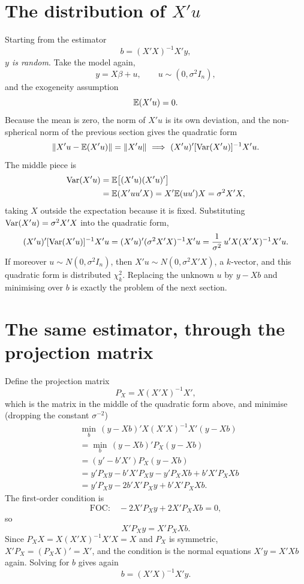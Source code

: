 \documentclass[11pt]{article}
\begin{document}
\section{The distribution of $X'u$}

Starting from the estimator
\[ b=(X'X)^{-1}X'y, \]
\emph{$y$ is random}. Take the model again,
\[ y=X\beta+u,\qquad u\sim(0,\sigma^2I_n), \]
and the exogeneity assumption
\[ \mathbb{E}(X'u)=0 . \]
Because the mean is zero, the norm of $X'u$ is its own deviation, and the
non-spherical norm of the previous section gives the quadratic form
\[ \|X'u-\E(X'u)\|=\|X'u\|\ \Longrightarrow\ (X'u)'[\Var(X'u)]^{-1}X'u . \]
The middle piece is
\[
\begin{aligned}
  \operatorname{Var}(X'u)&=\mathbb{E}\bigl[(X'u)(X'u)'\bigr]\\
           &=\mathbb{E}(X'uu'X)=X'\mathbb{E}(uu')X=\sigma^2X'X ,
\end{aligned}
\]
taking $X$ outside the expectation because it is fixed.
Substituting $\operatorname{Var}(X'u)=\sigma^2X'X$ into the quadratic form,
\[ (X'u)'[\operatorname{Var}(X'u)]^{-1}X'u
   =(X'u)'(\sigma^2X'X)^{-1}X'u
   =\frac{1}{\sigma^2}\,u'X(X'X)^{-1}X'u . \]
If moreover $u\sim N(0,\sigma^2I_n)$, then $X'u\sim N(0,\sigma^2X'X)$, a $k$-vector,
and this quadratic form is distributed $\chi^2_k$. Replacing the unknown $u$ by
$y-Xb$ and minimising over $b$ is exactly the problem of the next section.

\section{The same estimator, through the projection matrix}

Define the projection matrix
\[ P_X=X(X'X)^{-1}X', \]
which is the matrix in the middle of the quadratic form above, and minimise
(dropping the constant $\sigma^{-2}$)
\[
\begin{aligned}
  &\min_b\,(y-Xb)'X(X'X)^{-1}X'(y-Xb)\\
  &=\min_b\,(y-Xb)'P_X(y-Xb)\\
  &=(y'-b'X')P_X(y-Xb)\\
  &=y'P_Xy-b'X'P_Xy-y'P_XXb+b'X'P_XXb\\
  &=y'P_Xy-2b'X'P_Xy+b'X'P_XXb .
\end{aligned}
\]
The first-order condition is
\[ \text{FOC:}\quad -2X'P_Xy+2X'P_XXb=0, \]
so
\[ X'P_Xy=X'P_XXb . \]
Since $P_XX=X(X'X)^{-1}X'X=X$ and $P_X$ is symmetric, $X'P_X=(P_XX)'=X'$, and the
condition is the normal equations $X'y=X'Xb$ again. Solving for $b$ gives again
\[ b=(X'X)^{-1}X'y . \]
\end{document}
